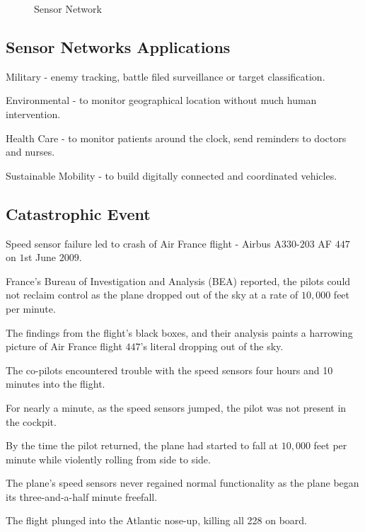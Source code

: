 \documentclass[%
  slidesonly,%
  semlayer%
  ]{xseminar}                                  %
\begin{document}
\begin{slide}
    \begin{figure}[h!]
      \centering
      \caption{Sensor Network}
      \label{fig:sensor-network}
    \end{figure}

    \clearpage

  \subsection*{Sensor Networks Applications}
    Military - enemy tracking, battle filed surveillance or target classification.

    Environmental - to monitor geographical location without much human intervention.
    
    Health Care - to monitor patients around the clock, send reminders to doctors and nurses.
  
    Sustainable Mobility - to build digitally connected and coordinated vehicles.

    \clearpage

  \subsection*{Catastrophic Event}
      Speed sensor failure led to crash of Air France flight - Airbus A$330$-$203$ AF $447$ on $1$st June $2009$.
      
      France's Bureau of Investigation and Analysis (BEA) reported, the pilots could not reclaim control as the plane dropped out of the sky at a rate of $10,000$ feet per minute.

      The findings from the flight's black boxes, and their analysis paints a harrowing picture of Air France flight $447$'s literal dropping out of the sky.

      The co-pilots encountered trouble with the speed sensors four hours and 10 minutes into the flight.

      For nearly a minute, as the speed sensors jumped, the pilot was not present in the cockpit. 
      
      By the time the pilot returned, the plane had started to fall at $10,000$ feet per minute while violently rolling from side to side.
      
      The plane's speed sensors never regained normal functionality as the plane began its three-and-a-half minute freefall.
      
      The flight plunged into the Atlantic nose-up, killing all 228 on board.
      

\end{slide}
\end{document}
